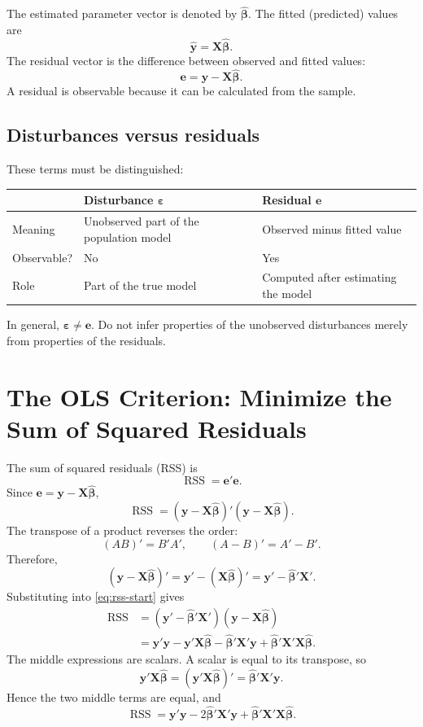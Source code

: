 \documentclass[11pt]{article}
\newcommand{\bhat}{\hat{\boldsymbol{\beta}}}
\newcommand{\eps}{\boldsymbol{\varepsilon}}
\newcommand{\ee}{\mathbf{e}}
\newcommand{\XX}{\mathbf{X}}
\newcommand{\yy}{\mathbf{y}}
\newcommand{\RSS}{\operatorname{RSS}}
\begin{document}
The estimated parameter vector is denoted by $\bhat$. The fitted (predicted) values are
\[
\widehat{\yy}=\XX\bhat.
\]
The residual vector is the difference between observed and fitted values:
\begin{equation}
    \boxed{\ee=\yy-\XX\bhat.}
    \label{eq:residual}
\end{equation}
A residual is observable because it can be calculated from the sample.

\subsection{Disturbances versus residuals}
These terms must be distinguished:
\begin{center}
\begin{tabular}{p{}p{}p{}}
\toprule
 & \textbf{Disturbance $\eps$} & \textbf{Residual $\ee$}\\
\midrule
Meaning & Unobserved part of the population model & Observed minus fitted value\\
Observable? & No & Yes\\
Role & Part of the true model & Computed after estimating the model\\
\bottomrule
\end{tabular}
\end{center}
In general, $\eps\ne\ee$. Do not infer properties of the unobserved disturbances merely from properties of the residuals.

\section{The OLS Criterion: Minimize the Sum of Squared Residuals}

The sum of squared residuals (RSS) is
\begin{equation}
    \RSS=\ee'\ee.
\end{equation}
Since $\ee=\yy-\XX\bhat$,
\begin{equation}
    \RSS=(\yy-\XX\bhat)'(\yy-\XX\bhat).
    \label{eq:rss-start}
\end{equation}
The transpose of a product reverses the order:
\[
(AB)'=B'A',
\qquad
(A-B)'=A'-B'.
\]
Therefore,
\[
(\yy-\XX\bhat)'=\yy'-(\XX\bhat)'=\yy'-\bhat'\XX'.
\]
Substituting into \eqref{eq:rss-start} gives
\begin{align}
\RSS
&=(\yy'-\bhat'\XX')(\yy-\XX\bhat)\\
&=\yy'\yy-\yy'\XX\bhat-\bhat'\XX'\yy+\bhat'\XX'\XX\bhat.
\end{align}
The middle expressions are scalars. A scalar is equal to its transpose, so
\[
\yy'\XX\bhat=(\yy'\XX\bhat)'=\bhat'\XX'\yy.
\]
Hence the two middle terms are equal, and
\begin{equation}
    \boxed{\RSS=\yy'\yy-2\bhat'\XX'\yy+\bhat'\XX'\XX\bhat.}
    \label{eq:rss-expanded}
\end{equation}
\end{document}
